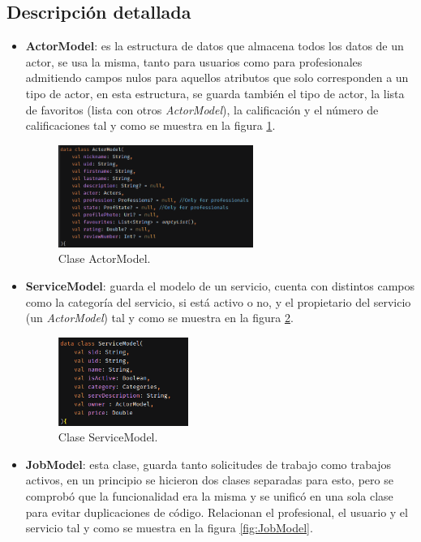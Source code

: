\subsection{Descripción detallada}
\begin{itemize}
    \item \textbf{ActorModel}: es la estructura de datos que almacena todos los datos de un actor, se usa la misma, tanto para usuarios como para profesionales admitiendo campos nulos para aquellos atributos que solo corresponden a un tipo de actor, en esta estructura, se guarda también el tipo de actor, la lista de favoritos (lista con otros \textit{ActorModel}), la calificación y el número de calificaciones tal y como se muestra en la figura \ref{fig:actorModel}.
    \begin{figure}[h]
        \centering
        \includegraphics[width = 0.6\textwidth]{Imagenes/Fuentes/actorModel.png}
        \caption{Clase ActorModel.}
        \label{fig:actorModel}
    \end{figure}
    \item \textbf{ServiceModel}: guarda el modelo de un servicio, cuenta con distintos campos como la categoría del servicio, si está activo o no, y el propietario del servicio (un \textit{ActorModel}) tal y como se muestra en la figura \ref{fig:ServiceModel}.
    \begin{figure}[h]
        \centering
        \includegraphics[width = 0.4\textwidth]{Imagenes/Fuentes/ServiceModel.png}
        \caption{Clase ServiceModel.}
        \label{fig:ServiceModel}
    \end{figure}
    \item \textbf{JobModel}: esta clase, guarda tanto solicitudes de trabajo como trabajos activos, en un principio se hicieron dos clases separadas para esto, pero se comprobó que la funcionalidad era la misma y se unificó en una sola clase para evitar duplicaciones de código. Relacionan el profesional, el usuario y el servicio tal y como se muestra en la figura \ref{fig:JobModel}.

\end{itemize}
